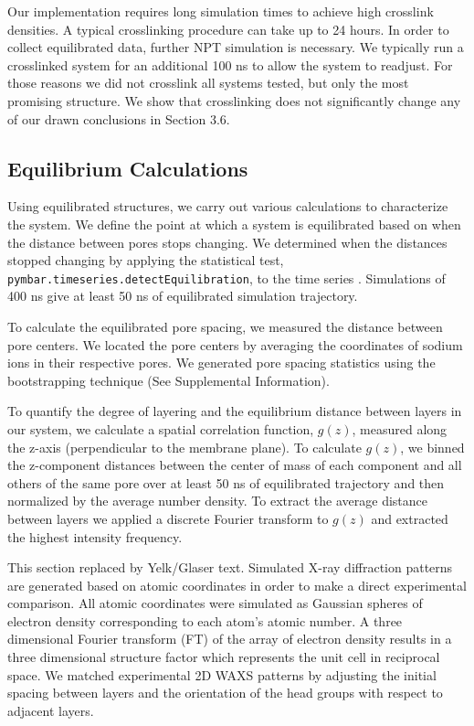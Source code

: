 \documentclass{article}
\begin{document}
  Our implementation requires long simulation times to achieve high crosslink 
  densities. A typical crosslinking procedure can take up to 24 hours. In
  order to collect equilibrated data, further NPT simulation is necessary. We
  typically run a crosslinked system for an additional 100 ns to allow the system
  to readjust. For those reasons we did not crosslink all systems tested, but only
  the most promising structure. We show that crosslinking does not significantly
  change any of our drawn conclusions in Section 3.6.

  \subsection{Equilibrium Calculations}

  Using equilibrated structures, we carry out various calculations to
  characterize the system. We define the point at which a system is equilibrated
  based on when the distance between pores stops changing.  We determined when
  the distances stopped changing by applying the statistical test,
  \texttt{pymbar.timeseries.detectEquilibration}, to the time series
  \cite{chodera_simple_2016,shirts_statistically_2008}. Simulations of 400 ns
  give at least 50 ns of equilibrated simulation trajectory.

  To calculate the equilibrated pore spacing, we measured the distance between
  pore centers. We located the pore centers by averaging the coordinates of sodium
  ions in their respective pores. We generated pore spacing statistics 
  using the bootstrapping technique (See Supplemental Information).

  To quantify the degree of layering and the equilibrium distance between layers
  in our system, we calculate a spatial correlation function, $g(z)$, measured
  along the z-axis (perpendicular to the membrane plane). To calculate $g(z)$,
  we binned the z-component distances between the center of mass of each
  component and all others of the same pore over at least 50 ns of equilibrated
  trajectory and then normalized by the average number density. To extract the
  average distance between layers we applied a discrete Fourier transform to
  $g(z)$ and extracted the highest intensity frequency.

  {\color{red}This section replaced by Yelk/Glaser text}. 
  Simulated X-ray diffraction patterns are generated based on atomic
  coordinates in order to make a direct experimental comparison. All atomic
  coordinates were simulated as Gaussian spheres of electron density
  corresponding to each atom's atomic number. A three dimensional Fourier
  transform (FT) of the array of electron density results in a three dimensional
  structure factor which represents the unit cell in reciprocal space. We matched
  experimental 2D WAXS patterns by adjusting the initial spacing between layers
  and the orientation of the head groups with respect to adjacent layers.
\end{document}

